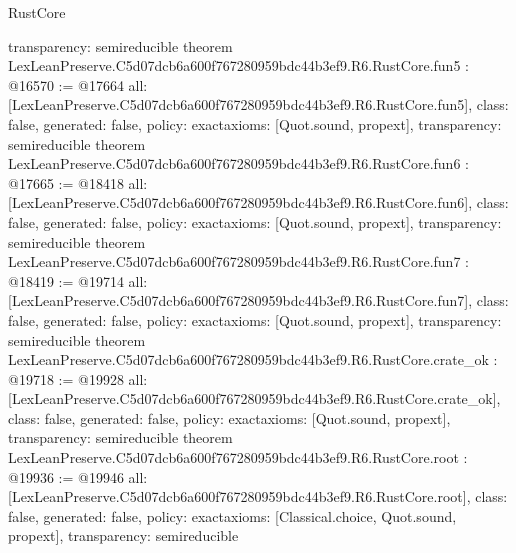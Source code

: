 \begin{lexlean}{RustCore}
\begin{coremodule}
{  transparency: semireducible
}
theorem LexLeanPreserve.C5d07dcb6a600f767280959bdc44b3ef9.R6.RustCore.fun5 : @16570 := @17664 {
  all: [LexLeanPreserve.C5d07dcb6a600f767280959bdc44b3ef9.R6.RustCore.fun5],
  class: false,
  generated: false,
  policy: exact{axioms: [Quot.sound, propext]},
  transparency: semireducible
}
theorem LexLeanPreserve.C5d07dcb6a600f767280959bdc44b3ef9.R6.RustCore.fun6 : @17665 := @18418 {
  all: [LexLeanPreserve.C5d07dcb6a600f767280959bdc44b3ef9.R6.RustCore.fun6],
  class: false,
  generated: false,
  policy: exact{axioms: [Quot.sound, propext]},
  transparency: semireducible
}
theorem LexLeanPreserve.C5d07dcb6a600f767280959bdc44b3ef9.R6.RustCore.fun7 : @18419 := @19714 {
  all: [LexLeanPreserve.C5d07dcb6a600f767280959bdc44b3ef9.R6.RustCore.fun7],
  class: false,
  generated: false,
  policy: exact{axioms: [Quot.sound, propext]},
  transparency: semireducible
}
theorem LexLeanPreserve.C5d07dcb6a600f767280959bdc44b3ef9.R6.RustCore.crate_ok : @19718 := @19928 {
  all: [LexLeanPreserve.C5d07dcb6a600f767280959bdc44b3ef9.R6.RustCore.crate_ok],
  class: false,
  generated: false,
  policy: exact{axioms: [Quot.sound, propext]},
  transparency: semireducible
}
theorem LexLeanPreserve.C5d07dcb6a600f767280959bdc44b3ef9.R6.RustCore.root : @19936 := @19946 {
  all: [LexLeanPreserve.C5d07dcb6a600f767280959bdc44b3ef9.R6.RustCore.root],
  class: false,
  generated: false,
  policy: exact{axioms: [Classical.choice, Quot.sound, propext]},
  transparency: semireducible
}


\end{coremodule}
\end{lexlean}
